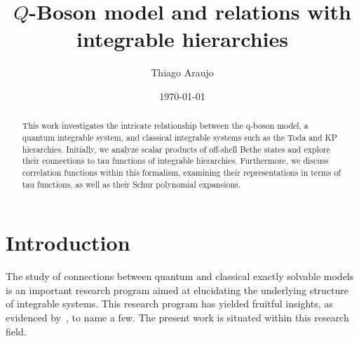 \documentclass[a4paper,11pt]{amsart}
\begin{document}

\title{\(Q\)-Boson model and relations with integrable hierarchies}

\author{Thiago Araujo}

\address{\noindent 
Instituto de Física Teórica, UNESP-Universidade Estadual Paulista, \\
Rua Dr. Bento T. Ferraz 271, Bl. II, São Paulo 01140-070, SP, Brazil
\\ \& \\
Instituto de Física, Universidade de São Paulo,\\
Rua do Matão, Travessa 1371, 05508-090 São Paulo, SP. Brazil
}


\begin{abstract}
This work investigates the intricate relationship between the q-boson
model, a quantum integrable system, and classical integrable systems
such as the Toda and KP hierarchies. Initially, we analyze scalar
products of off-shell Bethe states and explore their connections to
tau functions of integrable hierarchies. Furthermore, we discuss
correlation functions within this formalism, examining their
representations in terms of tau functions, as well as their Schur
polynomial expansions.
\end{abstract}

\date{\today}

\maketitle

\setcounter{tocdepth}{1}
\tableofcontents





\section{Introduction}

The study of connections between quantum and classical
exactly solvable models is an important research program aimed at
elucidating the underlying structure of integrable systems. This
research program has yielded fruitful insights, as evidenced
by~\cite{Its:1992bj, Foda:2009zz, Alexandrov:2011aa, Araujo:2021ghu},
to name a few. The present work is situated within this research field.
\end{document}
